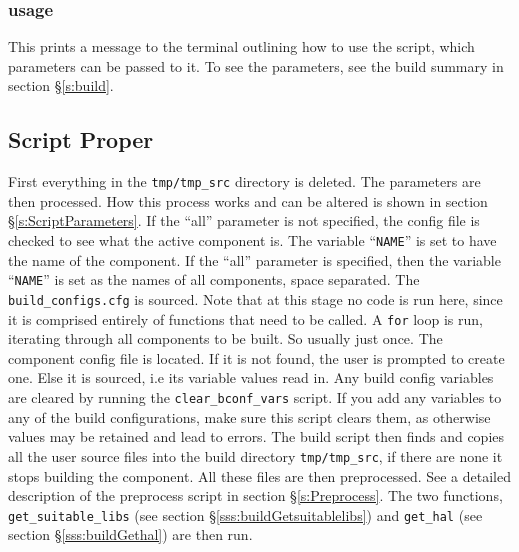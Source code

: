 \documentclass[a4paper, oneside, 11pt, titlepage, onecolumn, openright]{report}
\begin{document}
\subsubsection{usage}
			\label{sss:buildUsage}
			This prints a message to the terminal outlining how to use the script, which parameters can be passed to it. To see the parameters, see the build summary in section \S\ref{s:build}. 
			
\subsection{Script Proper}
			\label{sss:buildScriptProper}
			First everything in the \texttt{tmp/tmp\_src} directory is deleted. The parameters are then processed. How this process works and can be altered is shown in section \S\ref{s:ScriptParameters}.\newline
			If the ``all'' parameter is not specified, the config file is checked to see what the active component is. The variable ``\texttt{NAME}'' is set to have the name of the component.\newline
			If the ``all'' parameter is specified, then the variable ``\texttt{NAME}'' is set as the names of all components, space separated.\newline
			The \texttt{build\_configs.cfg} is sourced. Note that at this stage no code is run here, since it is comprised entirely of functions that need to be called.\newline
			A \texttt{for} loop is run, iterating through all components to be built. So usually just once.\newline
			The component config file is located. If it is not found, the user is prompted to create one. Else it is sourced, i.e its variable values read in. Any build config variables are cleared by running the \texttt{clear\_bconf\_vars} script. If you add any variables to any of the build configurations, make sure this script clears them, as otherwise values may be retained and lead to errors.\newline
			The build script then finds and copies all the user source files into the build directory \texttt{tmp/tmp\_src}, if there are none it stops building the component. All these files are then preprocessed. See a detailed description of the preprocess script in section \S\ref{s:Preprocess}.
			The two functions, \texttt{get\_suitable\_libs} (see section \S\ref{sss:buildGetsuitablelibs}) and \texttt{get\_hal} (see section \S\ref{sss:buildGethal}) are then run.
			
\end{document}
